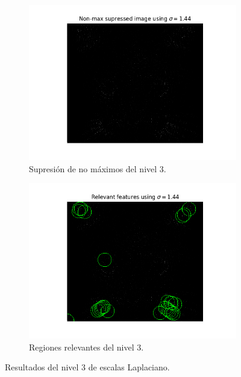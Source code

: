\documentclass[11pt,a4paper]{article}
\begin{document}
\begin{figure}[H]
\begin{subfigure}{.5\linewidth}
	\centering
	\includegraphics[scale=0.5]{img/non-max3.png}
	\caption{Supresión de no máximos del nivel 3.}
	\label{fig:non-max3}
\end{subfigure}
\begin{subfigure}{.5\linewidth}
	\centering
	\includegraphics[scale=0.5]{img/features3.png}
	\caption{Regiones relevantes del nivel 3.}
	\label{fig:features3}
\end{subfigure}
\caption{Resultados del nivel 3 de escalas Laplaciano.}
\label{fig:lap-scale-space3}
\end{figure}
\end{document}
